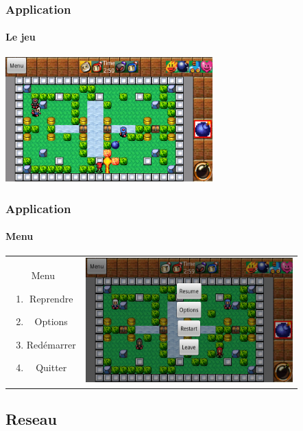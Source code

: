 	\begin{frame}
	\frametitle{Application}
	\framesubtitle{Le jeu}	
		\begin{center}
			\includegraphics[width=8cm]{img/game.png}
		\end{center}		
	
	\end{frame}
	
	\begin{frame}
	\frametitle{Application}
	\framesubtitle{Menu}
	
			\begin{tabular}{cc}
			\begin{minipage}{3cm}
				Menu
				\begin{enumerate}
					\item Reprendre
					\item Options
					\item Redémarrer
					\item Quitter
				\end{enumerate}
			\end{minipage} &
			\begin{minipage}{8cm}
				\includegraphics[width=8cm]{img/menusolo.png} 
			\end{minipage}\\
		\end{tabular}
	
	\end{frame}

\subsection{Reseau}

